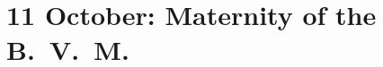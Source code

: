 {
\section{11 October: Maternity of the B.~V.~M.}
\subtitle{ Class}
\subtitle{I \& II Vespers}
\medskip


\def\definevesperspropers{
}
\def\definevesperspropersalt{}
\def\vesperspropersnote{At II Vespers:}
\def\vesperspropersaltnote{At I Vespers:}
\def\printhymnnote{
  {
    \oldneedspace{3\baselineskip}
    \printnote{Hymn.~\emph{Ave Maris Stella}, p.~\pageref{hymn-avemarisstella}.\\}
  }
}
\def\prepsalmtitletwo{}
\def\prepsalmtitlefive{\vspace{-0.7\baselineskip}}
\def\prevespers{
  \let\oldthing=\anttwotranslation
  \def\anttwotranslation{\vspace{-0.3\baselineskip}\oldthing\vspace{-0.7\baselineskip}}
}
\def\vrlabel{vr-october11}

\medskip
\benedicamusdomino[mary]{}
}